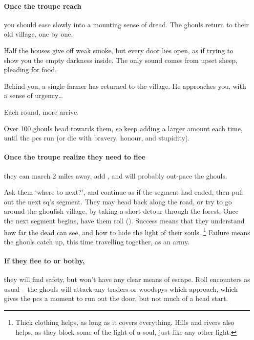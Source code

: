 \paragraph{Once the troupe reach }
you should ease slowly into a mounting sense of dread.
The ghouls return to their old \gls{village}, one by one.

\begin{boxtext}
  Half the houses give off weak smoke, but every door lies open, as if trying to show you the empty darkness inside.
  The only sound comes from upset sheep, pleading for food.

  Behind you, a single farmer has returned to the \gls{village}.
  He approaches you, with a sense of urgency\ldots
\end{boxtext}


Each round, more arrive.



Over 100 ghouls head towards them, so keep adding a larger amount each time, until the \glspl{pc} run (or die with bravery, honour, and stupidity).

\paragraph{Once the troupe realize they need to flee}
they can march 2 miles away, add , and will probably out-pace the ghouls.

Ask them `where to next?', and continue as if the \gls{segment} had ended, then pull out the next \gls{sq}'s \gls{segment}.
They may head back along the road, or try to go around the ghoulish \gls{village}, by taking a short detour through the forest.
Once the next \gls{segment} begins, have them roll  (\tn[12]).
Success means that they understand how far the dead can see, and how to hide the light of their souls.%
\footnote{Thick clothing helps, as long as it covers everything. Hills and rivers also helps, as they block some of the light of a soul, just like any other light.}
Failure means the ghouls catch up, this time travelling together, as an army.

\paragraph{If they flee to  or \gls{bothy},}
they will find safety, but won't have any clear means of escape.
Roll encounters as usual -- the ghouls will attack any traders or \glspl{woodspy} which approach, which gives the \glspl{pc} a moment to run out the door, but not much of a head start.

